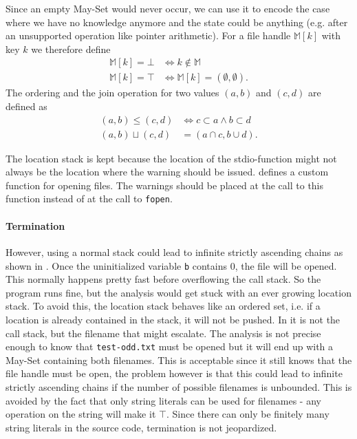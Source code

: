 Since an empty May-Set would never occur, we can use it to encode the case where we have no knowledge anymore and the state could be anything (e.g. after an unsupported operation like pointer arithmetic).
For a file handle $\mathbb{M}[k]$ with key $k$ we therefore define 
\begin{align}
\mathbb{M}[k] = \bot &\Leftrightarrow k \notin \mathbb{M}\\
\mathbb{M}[k] = \top &\Leftrightarrow \mathbb{M}[k] = (\emptyset, \emptyset).
\end{align}
The ordering and the join operation for two values $(a,b)$ and $(c,d)$ are defined as
\begin{align}
(a,b) \leq (c,d) &\Leftrightarrow c \subset a \wedge b \subset d\\
(a,b) \sqcup (c,d) &= (a \cap c, b \cup d).
\end{align}

The location stack is kept because the location of the stdio-function might not always be the location where the warning should be issued.  defines a custom function for opening files. The warnings should be placed at the call to this function instead of at the call to \verb|fopen|.

\paragraph*{Termination}
However, using a normal stack could lead to infinite strictly ascending chains as shown in . Once the uninitialized variable \verb|b| contains 0, the file will be opened. This normally happens pretty fast before overflowing the call stack. So the program runs fine, but the analysis would get stuck with an ever growing location stack. To avoid this, the location stack behaves like an ordered set, i.e. if a location is already contained in the stack, it will not be pushed. %
In  it is not the call stack, but the filename that might escalate. The analysis is not precise enough to know that \verb|test-odd.txt| must be opened but it will end up with a May-Set containing both filenames. This is acceptable since it still knows that the file handle must be open, the problem however is that this could lead to infinite strictly ascending chains if the number of possible filenames is unbounded. This is avoided by the fact that only string literals can be used for filenames - any operation on the string will make it $\top$. Since there can only be finitely many string literals in the source code, termination is not jeopardized.

